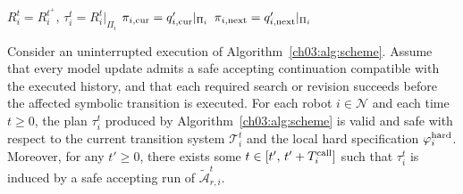 \begin{algorithm}[tp]
{

  \;
  $R_i^t = R_i^{t^+}$, $\tau_i^t = R_i^t|_{\Pi_i}$\;
  $\pi_{i,\textup{cur}} = q'_{i,\textup{cur}}|_{\Pi_i}$\;
  $\pi_{i,\textup{next}} = q'_{i,\textup{next}}|_{\Pi_i}$\;
  \;
}
\end{algorithm}

\begin{theorem}\label{ch03:theo:improvement}
\begin{revision}
Consider an uninterrupted execution of Algorithm~\ref{ch03:alg:scheme}.
Assume that every model update admits a safe accepting continuation
compatible with the executed history, and that each required search or
revision succeeds before the affected symbolic transition is executed.
For each robot $i \in \mathcal{N}$ and each time $t \geq 0$, the plan
$\tau_i^t$ produced by Algorithm~\ref{ch03:alg:scheme} is valid and safe with
respect to the current transition system $\mathcal{T}_i^t$ and the local hard
specification $\varphi_i^{\textup{hard}}$. Moreover, for any $t' \geq 0$,
there exists some $t \in [t',\, t' + T_i^{\textup{call}}]$ such that
$\tau_i^t$ is induced by a safe accepting run of
$\tilde{\mathcal{A}}_{r,i}^t$.
\end{revision}
\end{theorem}

